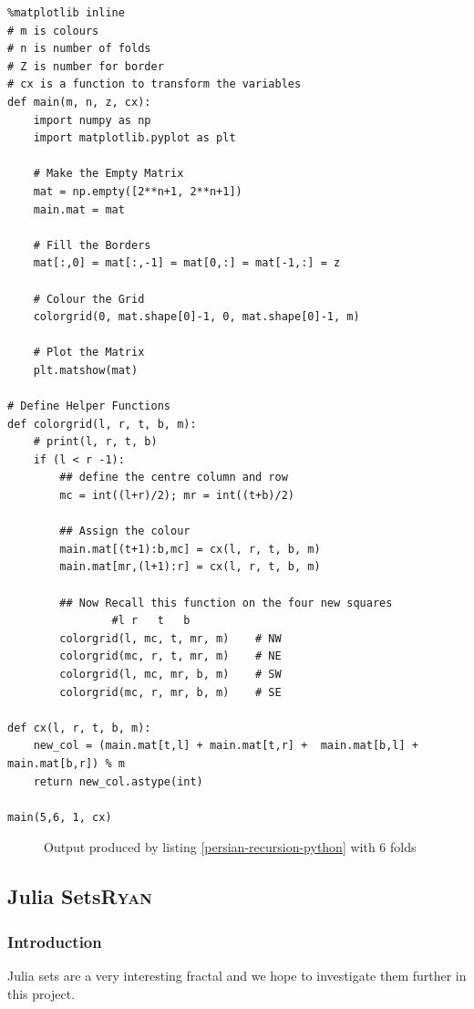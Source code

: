 \documentclass[11pt]{article}
\begin{document}
\begin{lstlisting}
%matplotlib inline
# m is colours
# n is number of folds
# Z is number for border
# cx is a function to transform the variables
def main(m, n, z, cx):
    import numpy as np
    import matplotlib.pyplot as plt

    # Make the Empty Matrix
    mat = np.empty([2**n+1, 2**n+1])
    main.mat = mat

    # Fill the Borders
    mat[:,0] = mat[:,-1] = mat[0,:] = mat[-1,:] = z

    # Colour the Grid
    colorgrid(0, mat.shape[0]-1, 0, mat.shape[0]-1, m)

    # Plot the Matrix
    plt.matshow(mat)

# Define Helper Functions
def colorgrid(l, r, t, b, m):
    # print(l, r, t, b)
    if (l < r -1):
        ## define the centre column and row
        mc = int((l+r)/2); mr = int((t+b)/2)

        ## Assign the colour
        main.mat[(t+1):b,mc] = cx(l, r, t, b, m)
        main.mat[mr,(l+1):r] = cx(l, r, t, b, m)

        ## Now Recall this function on the four new squares
                #l r   t   b
        colorgrid(l, mc, t, mr, m)    # NW
        colorgrid(mc, r, t, mr, m)    # NE
        colorgrid(l, mc, mr, b, m)    # SW
        colorgrid(mc, r, mr, b, m)    # SE

def cx(l, r, t, b, m):
    new_col = (main.mat[t,l] + main.mat[t,r] +  main.mat[b,l] + main.mat[b,r]) % m
    return new_col.astype(int)

main(5,6, 1, cx)
\end{lstlisting}



\begin{figure}[htbp]
\centering

\caption{\label{6-rug}Output produced by listing \ref{persian-recursion-python} with 6 folds}
\end{figure}

\subsection{Julia Sets\hfill{}\textsc{Ryan}}
\label{sec:org8a12b7d}
\subsubsection{Introduction}
\label{sec:orgcf3e2b5}
Julia sets are a very interesting fractal and we hope to investigate them further in this project.
\end{document}
